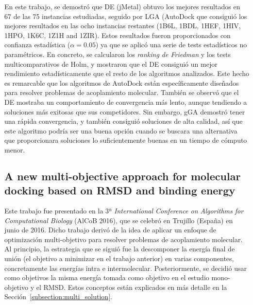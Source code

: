 En este trabajo, se demostró que DE (jMetal) obtuvo los mejores resultados en 67 de las 75 instancias estudiadas, seguido por LGA (AutoDock que consiguió los mejores resultados en las ocho instancias restantes (1B6L, 1BDL, 1HEF, 1HIV, 1HPO, 1K6C, 1Z1H and 1ZIR). Estos resultados fueron proporcionados con confianza estadística ($\alpha = 0.05$) ya que se aplicó una serie de tests estadísticos no paramétricos. En concreto, se calcularon los \emph{ranking de Friedman} y los tests multicomparativos de Holm, y mostraron que el DE consiguió un mejor rendimiento estadísticamente que el resto de los algoritmos analizados. Este hecho es remarcable que los algoritmos de AutoDock están específicamente diseñados para resolver problemas de acoplamiento molecular. También se observó que el DE mostraba un comportamiento de convergencia más lento, aunque tendiendo a soluciones más exitosas que sus competidores. Sin embargo, gGA demostró tener una rápida convergencia, y también consiguió soluciones de alta calidad, así que este algoritmo podría ser una buena opción cuando se buscara una alternativa que proporcionara soluciones lo suficientemente buenas en un tiempo de cómputo menor.

\subsection*{A new multi-objective approach for molecular docking based on RMSD and binding energy}

Este trabajo fue presentado en la 3ª \emph{International Conference on Algorithms for Computational Biology} (AlCoB 2016), que se celebró en Trujillo (España) en junio de 2016. Dicho trabajo derivó de la idea de aplicar un enfoque de optimización multi-objetivo para resolver problemas de acoplamiento molecular. Al principio, la estrategia que se siguió fue la descomponer la energía final de unión (el objetivo a minimizar en el trabajo anterior) en varias componentes, concretamente las energías intra e intermolecular. Posteriormente, se decidió usar como objetivos la misma energía tomada como objetivo en el estudio mono-objetivo y el RMSD. Estos conceptos están explicados en más detalle en la Sección~\ref{subsection:multi_solution}.

